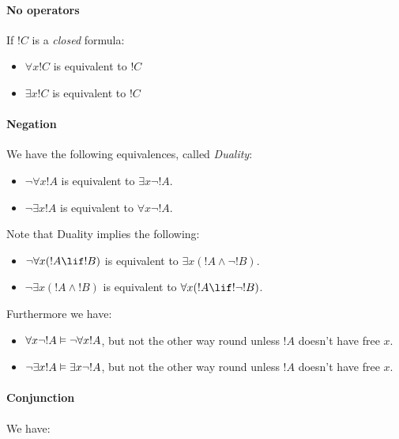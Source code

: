 \documentclass[../../../include/open-logic-section]{subfiles}
\begin{document}


\paragraph{No operators} If $!C$ is a \emph{closed} formula:

\begin{itemize}
	\item $\forall x !C$ is equivalent to $!C$
	\item $\exists x !C$ is equivalent to $!C$
\end{itemize}

\paragraph{Negation} We have the following equivalences, called \emph{Duality}:

\begin{itemize}
	\item $\lnot \forall x !A$ is equivalent to $\exists x \lnot !A$.
	\item $\lnot \exists x !A$ is equivalent to $\forall x \lnot !A$.
\end{itemize}

Note that Duality implies the following:

\begin{itemize}
	\item $\lnot \forall x (!A \lif !B) $ is equivalent to $\exists x (!A \land \lnot !B)$.
	\item $\lnot \exists x (!A \land !B)$ is equivalent to $\forall x (!A \lif !\lnot !B)$.
\end{itemize}

Furthermore we have:

\begin{itemize}
	\item $\forall x \lnot !A \Entails \lnot \forall x !A$, but not the other way round unless $!A$ doesn't have free $x$.
	\item $\lnot \exists x !A \Entails \exists x \lnot !A$, but not the other way round unless $!A$ doesn't have free $x$.
\end{itemize}

\paragraph{Conjunction} We have:
\end{document}
